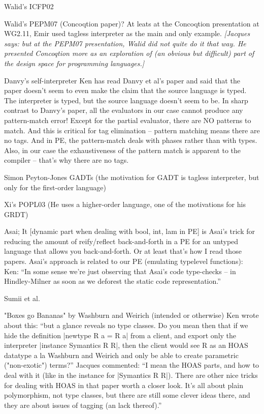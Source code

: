 \documentclass[preprint]{sigplanconf}
\newcommand{\jacques}[1]{{\it [Jacques says: #1]}}
\begin{document}
Walid's ICFP02

Walid's PEPM07 (Concoqtion paper)? At leats at the Concoqtion
presentation at WG2.11, Emir used tagless interpreter as the main and
only example. \jacques{but at the PEPM07 presentation, Walid did not
quite do it that way.  He presented Concoqtion more as an exploration
of (an obvious but difficult) part of the design space for programming
languages.}

Danvy's self-interpreter
Ken has read Danvy et al's paper and said that the paper
doesn't seem to even make the claim that the source language is
typed. The interpreter is typed, but the source language doesn't seem
to be.
In sharp contrast to Danvy's paper, all the evaluators in our case
cannot produce any pattern-match error! Except for the partial
evaluator, there are NO patterns to match. And this is critical for
tag elimination -- pattern matching means there are no tags. And in
PE, the pattern-match deals with phases rather than with types. Also,
in our case the exhaustiveness of the pattern match is apparent to the
compiler -- that's why there are no tags.

Simon Peyton-Jones GADTs (the motivation for GADT is tagless
interpreter, but only for the first-order language)

Xi's POPL03 (He uses a higher-order language, one of the motivations
for his GRDT)

Asai; 
It [dynamic part when dealing with bool, int, lam in PE] is
Asai's trick for reducing the amount of reify/reflect back-and-forth
in a PE for an untyped language that allows you back-and-forth.  Or at
least that's how I read those papers.
Asai's approach is related to our PE (emulating typelevel functions):
Ken: ``In some sense we're just observing that Asai's code type-checks
-- in Hindley-Milner as soon as we deforest the static code
representation.''

Sumii et al.

"Boxes go Bananas" by Washburn and Weirich (intended or otherwise) Ken
wrote about this: ``but a glance reveals no type classes.  Do you mean
then that if we hide the definition |newtype R a = R a| from a client,
and export only the interpreter |instance Symantics R R|, then the
client would see R as an HOAS datatype a la Washburn and Weirich and
only be able to create parametric ("non-exotic") terms?''  Jacques
commented: ``I mean the HOAS parts, and how to deal with it (like in
the instance for |Symantics R R|).  There are other nice tricks for
dealing with HOAS in that paper worth a closer look.  It's all about
plain polymorphism, not type classes, but there are still some clever
ideas there, and they are about issues of tagging (an lack thereof).''
\end{document}
